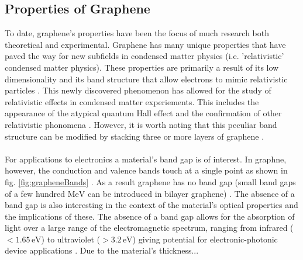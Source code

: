 \documentclass[%
 reprint,
 amsmath,amssymb,
 aps,
pra,
]{revtex4-1}
\begin{document}
\subsection{\label{subsec:properties_graphene} Properties of Graphene}
To date, graphene's properties have been the focus of much research both theoretical and experimental. Graphene has many unique properties that have paved the way for new subfields in condensed matter physics (i.e. 'relativistic' condensed matter physics). These properties are primarily a result of its low dimensionality and its band structure that allow electrons to mimic relativistic particles \cite{Giem2007}. This newly discovered phenomenon has allowed for the study of relativistic effects in condensed matter experiements. This includes the appearance of the atypical quantum Hall effect and the confirmation of other relativistic phonomena \cite{Geim2005_quantum, Zhang2011, Williams2007}. However, it is worth noting that this peculiar band structure can be modified by stacking three or more layers of graphene \cite{nanoscaleReview2011}. 
\\ \\
For applications to electronics a material's band gap is of interest. In graphne, however, the conduction and valence bands touch at a single point as shown in fig. \ref{fig:grapheneBands} \cite{Wallace1947, nanoscaleReview2011}. As a result graphene has no band gap (small band gaps of a few hundred $\textrm{MeV}$ can be introduced in bilayer graphene) \cite{grapheneLike2Dreview2013}. The absence of a band gap is also interesting in the context of the material's optical properties and the implications of these. The absence of a band gap allows for the absorption of light over a large range of the electromagnetic spectrum, ranging from infrared ($< 1.65 \mathrm{\,eV}$) to ultraviolet ($> 3.2 \mathrm{\,eV}$) giving potential for electronic-photonic device applications \cite{Wang2008, Geim2011, Xia2009}. Due to the material's thickness...
\end{document}
